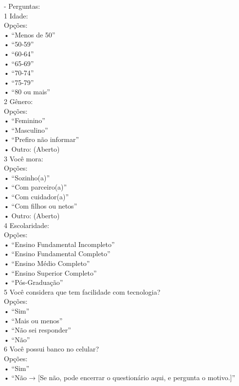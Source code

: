 - Perguntas:\\
1 Idade:\\
Opções:\\
• “Menos de 50”\\
• “50-59”\\
• “60-64”\\
• “65-69”\\
• “70-74”\\
• “75-79”\\
• “80 ou mais”\\

2 Gênero:\\
Opções:\\
• “Feminino”\\
• “Masculino”\\
• “Prefiro não informar”\\
• Outro: (Aberto)\\

3 Você mora:\\
Opções:\\
• “Sozinho(a)”\\
• “Com parceiro(a)”\\
• “Com cuidador(a)”\\
• “Com filhos ou netos”\\
• Outro: (Aberto)\\

4 Escolaridade:\\
Opções:\\
• “Ensino Fundamental Incompleto”\\
• “Ensino Fundamental Completo”\\
• “Ensino Médio Completo”\\
• “Ensino Superior Completo”\\
• “Pós-Graduação”\\

5 Você considera que tem facilidade com tecnologia?\\
Opções:\\
• “Sim”\\
• “Mais ou menos”\\
• “Não sei responder”\\
• “Não”\\

6 Você possui banco no celular?\\
Opções:\\
• “Sim”\\
• “Não → [Se não, pode encerrar o questionário aqui, e pergunta o motivo.]”\\

